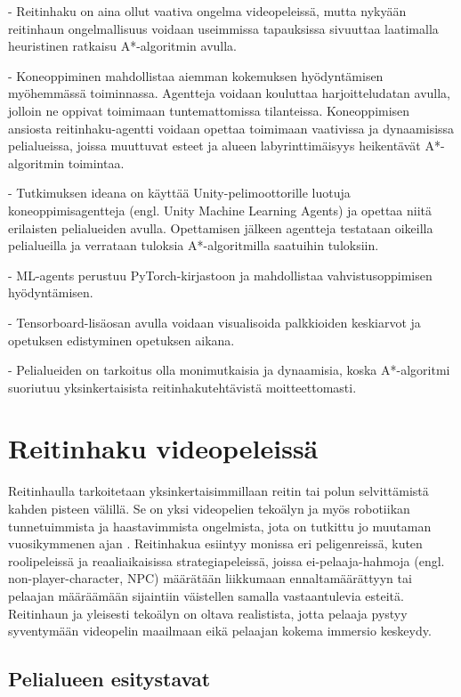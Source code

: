 \documentclass[utf8]{gradu3}
\begin{document}
- Reitinhaku on aina ollut vaativa ongelma videopeleissä, mutta nykyään reitinhaun ongelmallisuus voidaan
useimmissa tapauksissa sivuuttaa laatimalla heuristinen ratkaisu A*-algoritmin avulla.

- Koneoppiminen mahdollistaa aiemman kokemuksen hyödyntämisen myöhemmässä toiminnassa.
Agentteja voidaan kouluttaa harjoitteludatan avulla, jolloin ne oppivat toimimaan tuntemattomissa tilanteissa.
Koneoppimisen ansiosta reitinhaku-agentti voidaan opettaa toimimaan vaativissa ja
dynaamisissa pelialueissa, joissa muuttuvat esteet ja alueen labyrinttimäisyys
heikentävät A*-algoritmin toimintaa.

- Tutkimuksen ideana on käyttää Unity-pelimoottorille luotuja koneoppimisagentteja (engl. Unity Machine Learning Agents)
ja opettaa niitä erilaisten pelialueiden avulla. Opettamisen jälkeen agentteja testataan oikeilla
pelialueilla ja verrataan tuloksia A*-algoritmilla saatuihin tuloksiin.

- ML-agents perustuu PyTorch-kirjastoon ja mahdollistaa vahvistusoppimisen hyödyntämisen.

- Tensorboard-lisäosan avulla voidaan visualisoida palkkioiden keskiarvot ja opetuksen edistyminen opetuksen aikana.

- Pelialueiden on tarkoitus olla monimutkaisia ja dynaamisia, koska A*-algoritmi suoriutuu
yksinkertaisista reitinhakutehtävistä moitteettomasti.

\chapter{Reitinhaku videopeleissä}

Reitinhaulla tarkoitetaan yksinkertaisimmillaan reitin tai polun selvittämistä kahden pisteen välillä. Se on yksi videopelien tekoälyn ja myös robotiikan tunnetuimmista ja haastavimmista ongelmista, jota on tutkittu jo muutaman vuosikymmenen ajan \parencite{cui2011based,abd2015comprehensive}. Reitinhakua esiintyy monissa eri peligenreissä, kuten roolipeleissä ja reaaliaikaisissa strategiapeleissä, joissa ei-pelaaja-hahmoja (engl. non-player-character, NPC) määrätään liikkumaan ennaltamäärättyyn tai pelaajan määräämään sijaintiin väistellen samalla vastaantulevia esteitä. Reitinhaun ja yleisesti tekoälyn on oltava realistista, jotta pelaaja pystyy syventymään videopelin maailmaan eikä pelaajan kokema immersio keskeydy.

\section{Pelialueen esitystavat}
\end{document}
